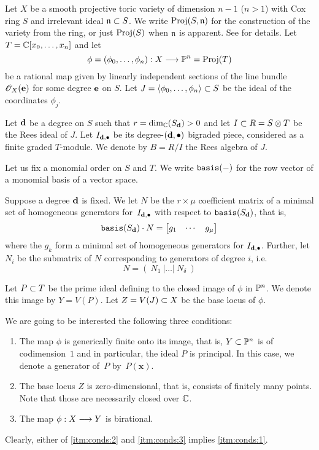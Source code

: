 \documentclass[fleqn,reqno]{amsart}
\begin{document}
\begin{paragraf}
\label{par:again}
\label{par:setup}
Let $X$ be a smooth projective toric variety of dimension $n-1$ ($n>1$)
with Cox ring $S$ and irrelevant ideal $\mathfrak{n}\subset S$.
We write $\operatorname{Proj}(S,\mathfrak{n})$ for the construction of the variety from the ring,
or just $\operatorname{Proj}(S)$ when $\mathfrak{n}$ is apparent. See \citet{Cox-93} for details.
Let $T=\mathbb{C}[x_0,\ldots,x_n]$ and let
\[
	\phi=(\phi_0,\ldots,\phi_n):X\longrightarrow\mathbb{P}^n=\operatorname{Proj}(T)
\]
be a rational map given by linearly independent sections of the line bundle $\mathscr{O}_X(\mathbf e)$
for some degree $\mathbf e$ on $S$.
Let $J=\langle \phi_0,\ldots,\phi_n\rangle\subset S$ be the ideal of the coordinates $\phi_j$.

Let $\mathbf d$ be a degree on $S$ such that $r=\dim_{\mathbb{C}}(S_\mathbf d)>0$ and
let $I\subset R=S\otimes T$ be the Rees ideal of $J$.
Let $I_{\mathbf d,\bullet}$ be its degree-$(\mathbf d,\bullet)$ bigraded piece,
considered as a finite graded $T$-module.
We denote by $B=R/I$ the Rees algebra of $J$.

Let us fix a monomial order on $S$ and $T$. We write $\mathop{\tt basis}(-)$ for the row vector
of a monomial basis of a vector space.

Suppose a degree $\mathbf d$ is fixed.
We let $N$ be the $r\times\mu$ coefficient matrix of
a minimal set of homogeneous generators for~$I_{\mathbf d,\bullet}$ with respect to $\mathop{\tt basis}(S_\mathbf d)$,
that is,
\[
	\mathop{\tt basis}(S_\mathbf d)\cdot N=\begin{bmatrix}g_1&\cdots& g_\mu\end{bmatrix}
\]
where the $g_k$ form a minimal set of homogeneous generators for $I_{\mathbf d,\bullet}$.
Further, let $N_i$ be the submatrix of $N$ corresponding to generators of degree $i$, i.e.
\[
	N=(~N_1~|\ldots|~N_\delta~)
\]
\end{paragraf}

\begin{paragraf}
\label{par:conds}
Let $P\subset T$ be the prime ideal defining to the closed image of $\phi$ in $\mathbb{P}^n$.
We denote this image by $Y=V(P)$.
Let $Z=V(J)\subset X$ be the base locus of $\phi$.

We are going to be interested the following three conditions:
\begin{enumerate}
\item
\label{itm:conds:1}
The map $\phi$ is generically finite onto its image, that is,
$Y\subset\mathbb{P}^n$ is of codimension~$1$ and in particular, the ideal $P$ is principal.
In this case, we denote a generator of~$P$ by~$P(\mathbf x)$.

\item
\label{itm:conds:2} The base locus $Z$ is zero-dimensional, that is,
consists of finitely many points.
Note that those are necessarily closed over $\mathbb{C}$.

\item
\label{itm:conds:3} The map $\phi:X\longrightarrow Y$ is birational.
\end{enumerate}

Clearly, either of \eqref{itm:conds:2} and \eqref{itm:conds:3} implies \eqref{itm:conds:1}.
\end{paragraf}
\end{document}
